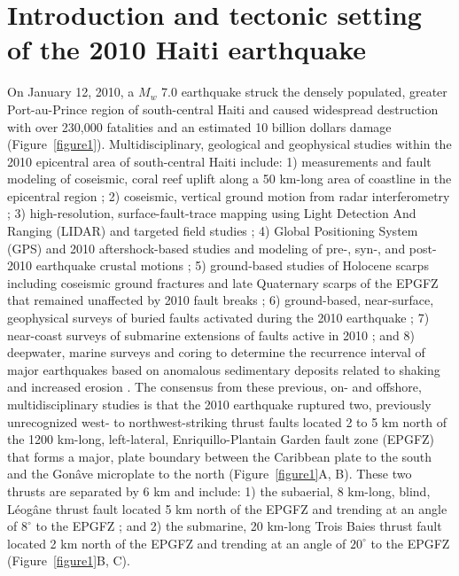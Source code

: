 \documentclass[linenumbers,draft]{agujournal}
\begin{document}
\section{Introduction and tectonic setting of the 2010 Haiti earthquake}
\label{sec:intro}
On January 12, 2010, a $M_w$ 7.0 earthquake struck the densely populated, greater Port-au-Prince region of south-central Haiti and caused widespread destruction with over 230,000 fatalities and an estimated 10 billion dollars damage \citep{prentice2010seismic,bilham2010lessons,paultre2013damage,kocel2016near} (Figure~\ref{figure1}). Multidisciplinary, geological and geophysical studies within the 2010 epicentral area of south-central Haiti include: 1) measurements and fault modeling of coseismic, coral reef uplift along a 50 km-long area of coastline in the epicentral region \citep{hayes2010complex}; 2) coseismic, vertical ground motion from radar interferometry \citep{hashimoto2011fan}; 3) high-resolution, surface-fault-trace mapping using Light Detection And Ranging (LIDAR) and targeted field studies \citep{cowgill2012interactive}; 4) Global Positioning System (GPS) and 2010 aftershock-based studies and modeling of pre-, syn-, and post-2010 earthquake crustal motions \citep{calais2010transpressional,nettles2010earthquake,symithe2013coseismic,douilly2013crustal,douilly2015three}; 5) ground-based studies of Holocene scarps including coseismic ground fractures and late Quaternary scarps of the EPGFZ that remained unaffected by 2010 fault breaks \citep{prentice2010seismic,koehler2011field,rathje2014geotechnical,saint2015seismotectonics}; 6) ground-based, near-surface, geophysical surveys of buried faults activated during the 2010 earthquake \citep{kocel2016near}; 7) near-coast surveys of submarine extensions of faults active in 2010 \citep{hornbach2010high,mercier20112010}; and 8) deepwater, marine surveys and coring to determine the recurrence interval of major earthquakes based on anomalous sedimentary deposits related to shaking and increased erosion \citep{mchugh2011offshore}. The consensus from these previous, on- and offshore, multidisciplinary studies is that the 2010 earthquake ruptured two, previously unrecognized west- to northwest-striking thrust faults located 2 to 5 km north of the 1200 km-long, left-lateral, Enriquillo-Plantain Garden fault zone (EPGFZ) that forms a major, plate boundary between the Caribbean plate to the south and the Gon\^ave microplate to the north \citep{mann1995actively,calais2010transpressional,benford2012gps,corbeau2016transpressive} (Figure~\ref{figure1}A, B). These two thrusts are separated by 6 km and include: 1) the subaerial, 8 km-long, blind, L\'eog\^ane thrust fault located 5 km north of the EPGFZ and trending at an angle of $8^{\circ}$ to the EPGFZ \citep{calais2010transpressional,douilly2013crustal,douilly2015three}; and 2) the submarine, 20 km-long Trois Baies thrust fault located 2 km north of the EPGFZ and trending at an angle of $20^{\circ}$ to the EPGFZ \citep{mercier20112010,symithe2013coseismic} (Figure~\ref{figure1}B, C).
\end{document}
